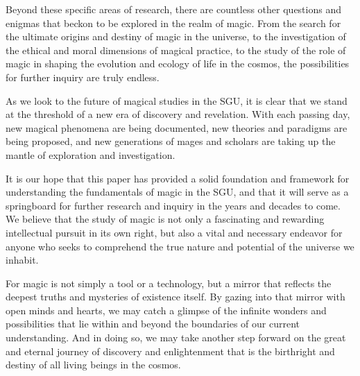\documentclass[12pt]{article}
\begin{document}
Beyond these specific areas of research, there are countless other questions and enigmas that beckon to be explored in the realm of magic. From the search for the ultimate origins and destiny of magic in the universe, to the investigation of the ethical and moral dimensions of magical practice, to the study of the role of magic in shaping the evolution and ecology of life in the cosmos, the possibilities for further inquiry are truly endless.

As we look to the future of magical studies in the SGU, it is clear that we stand at the threshold of a new era of discovery and revelation. With each passing day, new magical phenomena are being documented, new theories and paradigms are being proposed, and new generations of mages and scholars are taking up the mantle of exploration and investigation.

It is our hope that this paper has provided a solid foundation and framework for understanding the fundamentals of magic in the SGU, and that it will serve as a springboard for further research and inquiry in the years and decades to come. We believe that the study of magic is not only a fascinating and rewarding intellectual pursuit in its own right, but also a vital and necessary endeavor for anyone who seeks to comprehend the true nature and potential of the universe we inhabit.

For magic is not simply a tool or a technology, but a mirror that reflects the deepest truths and mysteries of existence itself. By gazing into that mirror with open minds and hearts, we may catch a glimpse of the infinite wonders and possibilities that lie within and beyond the boundaries of our current understanding. And in doing so, we may take another step forward on the great and eternal journey of discovery and enlightenment that is the birthright and destiny of all living beings in the cosmos.
\end{document}
